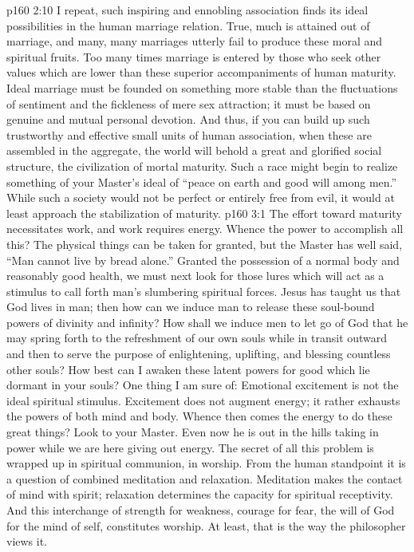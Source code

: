 \pc \vs p160 2:10 I repeat, such inspiring and ennobling association finds its ideal possibilities in the human marriage relation. True, much is attained out of marriage, and many, many marriages utterly fail to produce these moral and spiritual fruits. Too many times marriage is entered by those who seek other values which are lower than these superior accompaniments of human maturity. Ideal marriage must be founded on something more stable than the fluctuations of sentiment and the fickleness of mere sex attraction; it must be based on genuine and mutual personal devotion. And thus, if you can build up such trustworthy and effective small units of human association, when these are assembled in the aggregate, the world will behold a great and glorified social structure, the civilization of mortal maturity. Such a race might begin to realize something of your Master’s ideal of “peace on earth and good will among men.” While such a society would not be perfect or entirely free from evil, it would at least approach the stabilization of maturity.\plusone
{}
\vs p160 3:1 The effort toward maturity necessitates work, and work requires energy. Whence the power to accomplish all this? The physical things can be taken for granted, but the Master has well said, \textcolor{ubdarkred}{“Man cannot live by bread alone.”} Granted the possession of a normal body and reasonably good health, we must next look for those lures which will act as a stimulus to call forth man’s slumbering spiritual forces. Jesus has taught us that God lives in man; then how can we induce man to release these soul\hyp{}bound powers of divinity and infinity? How shall we induce men to let go of God that he may spring forth to the refreshment of our own souls while in transit outward and then to serve the purpose of enlightening, uplifting, and blessing countless other souls? How best can I awaken these latent powers for good which lie dormant in your souls? One thing I am sure of: Emotional excitement is not the ideal spiritual stimulus. Excitement does not augment energy; it rather exhausts the powers of both mind and body. Whence then comes the energy to do these great things? Look to your Master. Even now he is out in the hills taking in power while we are here giving out energy. The secret of all this problem is wrapped up in spiritual communion, in worship. From the human standpoint it is a question of combined meditation and relaxation. Meditation makes the contact of mind with spirit; relaxation determines the capacity for spiritual receptivity. And this interchange of strength for weakness, courage for fear, the will of God for the mind of self, constitutes worship. At least, that is the way the philosopher views it.
